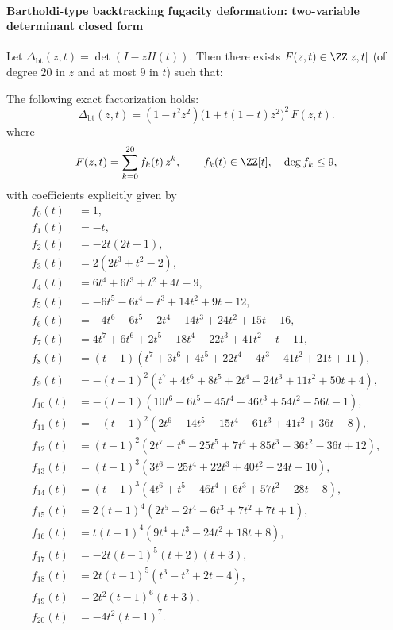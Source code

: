 \paragraph{Bartholdi-type backtracking fugacity deformation: two-variable determinant closed form}
Let \(\Delta_{\mathrm{bt}}(z,t)=\det(I-zH(t))\).
Then there exists \(F(z,t)\in\ZZ[z,t]\) (of degree \(20\) in \(z\) and at most \(9\) in \(t\)) such that:
\begin{theorem}\label{thm:real-input-40-bartholdi-det}
The following exact factorization holds:
\[
\boxed{
\Delta_{\mathrm{bt}}(z,t)=(1-t^2 z^2)\bigl(1+t(1-t)z^2\bigr)^2\,F(z,t).
}
\]
where
\[
F(z,t)=\sum_{k=0}^{20}f_k(t)\,z^k,\qquad f_k(t)\in\ZZ[t],\quad \deg f_k\le 9,
\]
with coefficients explicitly given by
\[
\begin{aligned}
f_0(t)&=1,\\
f_1(t)&=-t,\\
f_2(t)&=-2t(2t+1),\\
f_3(t)&=2(2t^3+t^2-2),\\
f_4(t)&=6t^4+6t^3+t^2+4t-9,\\
f_5(t)&=-6t^5-6t^4-t^3+14t^2+9t-12,\\
f_6(t)&=-4t^6-6t^5-2t^4-14t^3+24t^2+15t-16,\\
f_7(t)&=4t^7+6t^6+2t^5-18t^4-22t^3+41t^2-t-11,\\
f_8(t)&=(t-1)(t^7+3t^6+4t^5+22t^4-4t^3-41t^2+21t+11),\\
f_9(t)&=-(t-1)^2(t^7+4t^6+8t^5+2t^4-24t^3+11t^2+50t+4),\\
f_{10}(t)&=-(t-1)(10t^6-6t^5-45t^4+46t^3+54t^2-56t-1),\\
f_{11}(t)&=-(t-1)^2(2t^6+14t^5-15t^4-61t^3+41t^2+36t-8),\\
f_{12}(t)&=(t-1)^2(2t^7-t^6-25t^5+7t^4+85t^3-36t^2-36t+12),\\
f_{13}(t)&=(t-1)^3(3t^6-25t^4+22t^3+40t^2-24t-10),\\
f_{14}(t)&=(t-1)^3(4t^6+t^5-46t^4+6t^3+57t^2-28t-8),\\
f_{15}(t)&=2(t-1)^4(2t^5-2t^4-6t^3+7t^2+7t+1),\\
f_{16}(t)&=t(t-1)^4(9t^4+t^3-24t^2+18t+8),\\
f_{17}(t)&=-2t(t-1)^5(t+2)(t+3),\\
f_{18}(t)&=2t(t-1)^5(t^3-t^2+2t-4),\\
f_{19}(t)&=2t^2(t-1)^6(t+3),\\
f_{20}(t)&=-4t^2(t-1)^7.
\end{aligned}
\]
\end{theorem}

